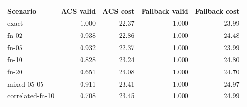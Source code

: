 \begin{tabular}{lrrrr}
\toprule
Scenario & ACS valid & ACS cost & Fallback valid & Fallback cost \\
\midrule
exact & 1.000 & 22.37 & 1.000 & 23.99 \\
fn-02 & 0.938 & 22.86 & 1.000 & 24.48 \\
fn-05 & 0.932 & 22.37 & 1.000 & 23.99 \\
fn-10 & 0.828 & 23.24 & 1.000 & 24.80 \\
fn-20 & 0.651 & 23.08 & 1.000 & 24.70 \\
mixed-05-05 & 0.911 & 23.41 & 1.000 & 24.97 \\
correlated-fn-10 & 0.708 & 23.45 & 1.000 & 24.99 \\
\bottomrule
\end{tabular}

